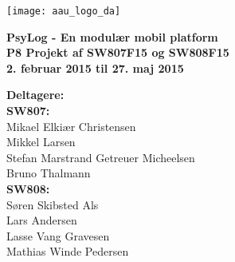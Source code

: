 \hspace*{-1cm}\parbox[b][\textheight][t]{\textwidth}
{

\begin{center}
	\texttt{[image: aau\_logo\_da]}\\
	\vspace{0.25cm}
\end{center} 

\vspace{1cm}
\begin{center}

\textbf{\Huge {PsyLog - En modulær mobil platform}} \\ \vspace{0.5cm}
\textbf{\Large P8 Projekt af SW807F15 og SW808F15}\\ \vspace{0.5cm}
\textbf{\large 2. februar 2015 til 27. maj 2015}\\
\end{center}



\vspace{0.25cm}
\begin{center}
\item {\textbf{Deltagere:}} \\
\textbf{SW807:}\\
Mikael Elkiær Christensen\\
Mikkel Larsen\\
Stefan Marstrand Getreuer Micheelsen\\
Bruno Thalmann\\[0.2cm]
\textbf{SW808:}\\
Søren Skibsted Als\\
Lars Andersen\\
Lasse Vang Gravesen\\
Mathias Winde Pedersen

\end{center}

\thispagestyle{empty}

\newpage
\thispagestyle{empty}
\mbox{}
}